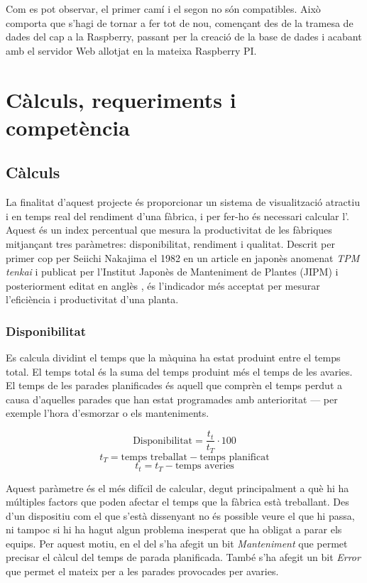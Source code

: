 \documentclass{tfgitic}[2022/06/30]
\begin{document}
Com es pot observar, el primer camí i el segon no són compatibles. Això comporta que s'hagi de tornar a fer tot de nou, començant des de la tramesa de dades del  cap a la Raspberry, passant per la creació de la base de dades i acabant amb el servidor Web allotjat en la mateixa Raspberry PI.

\chapter{Càlculs, requeriments i competència}
\label{Chapter: CalcReqCom}
\section{Càlculs}
\label{section:oee}
La finalitat d'aquest projecte és proporcionar un sistema de visualització atractiu i en temps real del rendiment d'una fàbrica, i per fer-ho és necessari calcular l'. Aquest és un index percentual que mesura la productivitat de les fàbriques mitjançant tres paràmetres: disponibilitat, rendiment i qualitat. Descrit per primer cop per Seiichi Nakajima el 1982 en un article en japonès anomenat \emph{TPM tenkai} i publicat per l'Institut Japonès de Manteniment de Plantes (JIPM)\cite{IntangibleCapital:tpm01} i posteriorment editat en anglès \cite{Nakajima:tpm01}, és l'indicador més acceptat per mesurar l'eficiència i productivitat d'una planta.

\subsection{Disponibilitat}
Es calcula dividint el temps que la màquina ha estat produint entre el temps total. El temps total és la suma del temps produint més el temps de les avaries. El temps de les parades planificades és aquell que comprèn el temps perdut a causa d'aquelles parades que han estat programades amb anterioritat --- per exemple l'hora d'esmorzar o els manteniments.

\[\textrm{Disponibilitat} = \frac{t_{t}}{t_{T}} \cdot 100\]
\[t_{T} = \textrm{temps treballat} - \textrm{temps planificat}\]
\[t_{t} = t_{T} - \textrm{temps averies}\]

Aquest paràmetre és el més difícil de calcular, degut principalment a què hi ha múltiples factors que poden afectar el temps que la fàbrica està treballant. Des d'un dispositiu com el que s'està dissenyant no és possible veure el que hi passa, ni tampoc si hi ha hagut algun problema inesperat que ha obligat a parar els equips. Per aquest motiu, en el  del  s'ha afegit un bit \emph{Manteniment} que permet precisar el càlcul del temps de parada planificada. També s'ha afegit un bit \emph{Error} que permet el mateix per a les parades provocades per avaries.
\end{document}
